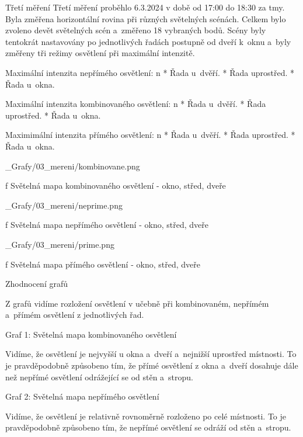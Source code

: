 \sec Třetí měření
Třetí měření proběhlo 6.3.2024 v době od 17:00 do 18:30 za tmy.
Byla změřena horizontální rovina při různých světelných scénách.
Celkem bylo zvoleno devět světelných scén a~změřeno 18 vybraných bodů.
Scény byly tentokrát nastavovány po jednotlivých
řadách postupně od dveří k~oknu a~byly změřeny tři režimy osvětlení při maximální intenzitě.\noindent

\medskip\noindent
{\sbf Maximální intenzita nepřímého osvětlení:}
\begitems \style n
    * Řada u~dvěří.
    * Řada uprostřed.
    * Řada u~okna.
\enditems

\medskip\noindent
{\sbf Maximální intenzita kombinovaného osvětlení:}
\begitems \style n
    * Řada u~dvěří.
    * Řada uprostřed.
    * Řada u~okna.
\enditems


\medskip\noindent
{\sbf Maximimální intenzita přímého osvětlení:}
\begitems \style n
    * Řada u~dvěří.
    * Řada uprostřed.
    * Řada u~okna.
\enditems

\medskip {}
\picw=18cm _Grafy/03_mereni/kombinovane.png
\caption/f Světelná mapa kombinovaného osvětlení - okno, střed, dveře
\medskip

\medskip {}
\picw=18cm _Grafy/03_mereni/neprime.png
\caption/f Světelná mapa nepřímého osvětlení - okno, střed, dveře
\medskip

\medskip {}
\picw=18cm _Grafy/03_mereni/prime.png
\caption/f Světelná mapa přímého osvětlení - okno, střed, dveře
\medskip


\medskip\noindent
{\sbf Zhodnocení grafů}

Z grafů vidíme rozložení osvětlení v učebně při kombinovaném, nepřímém a~přímém osvětlení z jednotlivých řad.

Graf 1: Světelná mapa kombinovaného osvětlení

Vidíme, že osvětlení je nejvyšší u okna a~dveří a~nejnižší uprostřed místnosti.
To je pravděpodobně způsobeno tím, že přímé osvětlení z okna a~dveří dosahuje dále než nepřímé osvětlení
odrážející se od stěn a~stropu.

Graf 2: Světelná mapa nepřímého osvětlení

Vidíme, že osvětlení je relativně rovnoměrně rozloženo po celé místnosti. To je pravděpodobně způsobeno tím,
že nepřímé osvětlení se odráží od stěn a~stropu.

